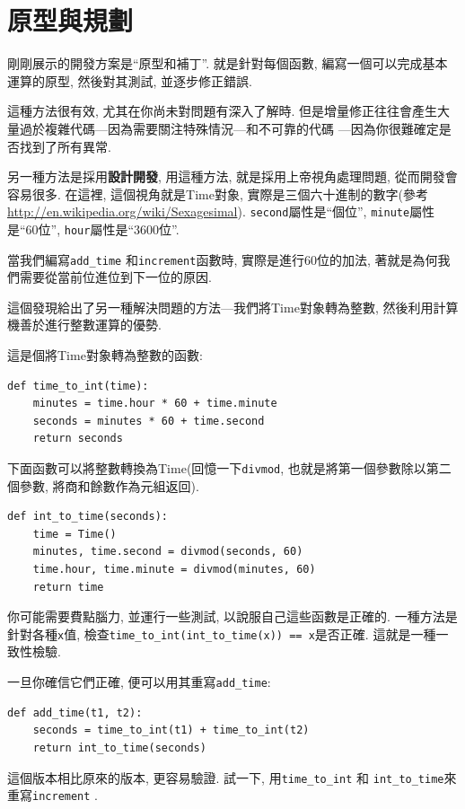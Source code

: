 \documentclass[10pt]{book}
\begin{document}
\section{原型與規劃}
\label{prototype}

剛剛展示的開發方案是``原型和補丁''.
就是針對每個函數, 編寫一個可以完成基本運算的原型, 然後對其測試, 
並逐步修正錯誤. 

這種方法很有效, 尤其在你尚未對問題有深入了解時. 
但是增量修正往往會產生大量過於複雜代碼---因為需要關注特殊情況---和不可靠的代碼
---因為你很難確定是否找到了所有異常. 

另一種方法是採用{\bf 設計開發}, 用這種方法, 就是採用上帝視角處理問題, 
從而開發會容易很多. 
在這裡, 這個視角就是Time對象, 實際是三個六十進制的數字(參考\url{http://en.wikipedia.org/wiki/Sexagesimal}). 
{\tt second}屬性是``個位'', {\tt minute}屬性是``60位'', {\tt hour}屬性是``3600位''.

當我們編寫\verb"add_time" 和{\tt increment}函數時, 
實際是進行60位的加法, 著就是為何我們需要從當前位進位到下一位的原因. 

這個發現給出了另一種解決問題的方法---我們將Time對象轉為整數, 
然後利用計算機善於進行整數運算的優勢. 

這是個將Time對象轉為整數的函數:

\begin{verbatim}
def time_to_int(time):
    minutes = time.hour * 60 + time.minute
    seconds = minutes * 60 + time.second
    return seconds
\end{verbatim}
%
下面函數可以將整數轉換為Time(回憶一下{\tt divmod}, 也就是將第一個參數除以第二個參數, 
將商和餘數作為元組返回). 

\begin{verbatim}
def int_to_time(seconds):
    time = Time()
    minutes, time.second = divmod(seconds, 60)
    time.hour, time.minute = divmod(minutes, 60)
    return time
\end{verbatim}
%
你可能需要費點腦力, 並運行一些測試, 以說服自己這些函數是正確的. 
一種方法是針對各種{\tt x}值, 檢查\verb"time_to_int(int_to_time(x)) == x"是否正確. 
這就是一種一致性檢驗. 

一旦你確信它們正確, 便可以用其重寫\verb"add_time":

\begin{verbatim}
def add_time(t1, t2):
    seconds = time_to_int(t1) + time_to_int(t2)
    return int_to_time(seconds)
\end{verbatim}
%
這個版本相比原來的版本, 更容易驗證. 
試一下, 用\verb"time_to_int" 和
\verb"int_to_time"來重寫{\tt increment} . 
\end{document}
